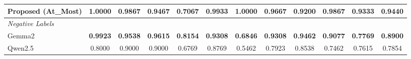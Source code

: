 \begin{table}[h!]
{\begin{tabular}{lcccccccccc||c}
            Proposed (At\_Most)                & \textbf{1.0000}                                         & \textbf{0.9867}                                                  & 0.9467                                                  & 0.7067                                                            & \textbf{0.9933}                                         & \textbf{1.0000}                                           & 0.9667                                                            & 0.9200                                                  & \textbf{0.9867}                        & 0.9333                                   & 0.9440 \\
            \hline
            \textit{Negative Labels}           &                                                         &                                                         &                                                         &                                                                   &                                                          &                                                           &                                                                  &                                                         &                                        &                                          &       \\
            Gemma2                             & \textbf{0.9923}                                         & \textbf{0.9538}                                         & \textbf{0.9615}                                         & \textbf{0.8154}                                                   & \textbf{0.9308}                                         & \textbf{0.6846}                                           & \textbf{0.9308}                                                   & \textbf{0.9462}                                         & \textbf{0.9077}                        & \textbf{0.7769}                          & \textbf{0.8900} \\
            Qwen2.5                            & 0.8000                                                  & 0.9000                                                  & 0.9000                                                  & 0.6769                                                            & 0.8769                                                  & 0.5462                                                    & 0.7923                                                            & 0.8538                                                  & 0.7462                                 & 0.7615                                   & 0.7854 \\

\end{tabular}}
\end{table}
